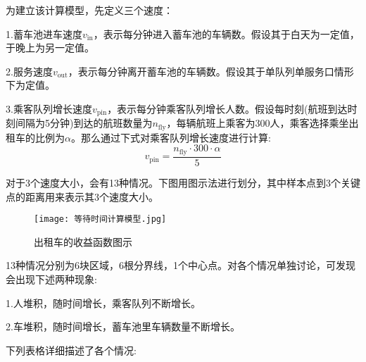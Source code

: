 \documentclass[withoutpreface,bwprint]{cumcmthesis} %
\begin{document}
为建立该计算模型，先定义三个速度：

1.蓄车池进车速度$v_{\mathrm{in}}$，表示每分钟进入蓄车池的车辆数。假设其于白天为一定值，于晚上为另一定值。

2.服务速度$v_{\mathrm{out}}$，表示每分钟离开蓄车池的车辆数。假设其于单队列单服务口情形下为定值。

3.乘客队列增长速度$v_{\mathrm{pin}}$，表示每分钟乘客队列增长人数。假设每时刻(航班到达时刻间隔为5分钟)到达的航班数量为$n_{\mathrm{fly}}$，每辆航班上乘客为300人，乘客选择乘坐出租车的比例为$\alpha$。那么通过下式对乘客队列增长速度进行计算:
\begin{equation}
	v_{\mathrm{pin}}=\frac{n_{\mathrm{fly}}\cdot 300 \cdot \alpha}{5}
\end{equation}

对于3个速度大小，会有13种情况。下图用图示法进行划分，其中样本点到3个关键点的距离用来表示其3个速度大小。

\begin{figure}[!h]
	\centering
	\texttt{[image: 等待时间计算模型.jpg]}
	\caption{出租车的收益函数图示}
\end{figure}

13种情况分别为6块区域，6根分界线，1个中心点。对各个情况单独讨论，可发现会出现下述两种现象:

1.人堆积，随时间增长，乘客队列不断增长。

2.车堆积，随时间增长，蓄车池里车辆数量不断增长。

下列表格详细描述了各个情况:
\end{document}
